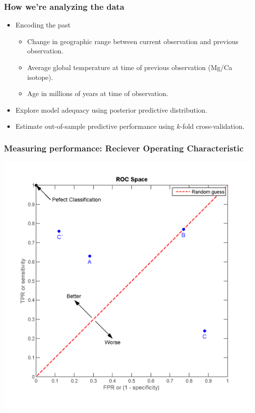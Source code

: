\documentclass{beamer}
\begin{document}
\begin{frame}
  \frametitle{How we're analyzing the data}

  \begin{itemize}%
    \item Encoding the past
      \begin{itemize}
        \item Change in geographic range between current observation and previous observation.
        \item Average global temperature at time of previous observation (Mg/Ca isotope).
        \item Age in millions of years at time of observation.
      \end{itemize}
    \item Explore model adequacy using posterior predictive distribution.
    \item Estimate out-of-sample predictive performance using \(k\)-fold cross-validation.
  \end{itemize}

\end{frame}


\begin{frame}
  \frametitle{Measuring performance: Reciever Operating Characteristic}

  \begin{center}
    \includegraphics[width=\textwidth,height=0.8\textheight,keepaspectratio=true]{figure/wiki_ROC_space-2}
  \end{center}
  

\end{frame}
\end{document}
